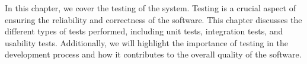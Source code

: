 In this chapter, we cover the testing of the system.
Testing is a crucial aspect of ensuring the reliability and correctness of the software.
This chapter discusses the different types of tests performed, including unit tests,
integration tests, and usability tests.
Additionally, we will highlight the importance of testing in the development process and how it contributes
to the overall quality of the software.
